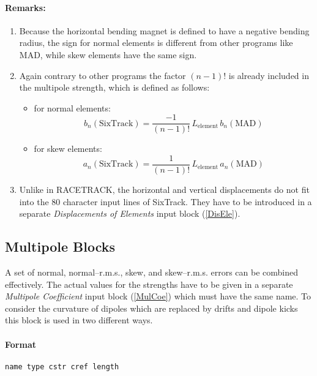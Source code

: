 \paragraph{Remarks:}
\begin{enumerate}
    \item Because the horizontal bending magnet is defined to have a negative bending radius, the sign for normal elements is different from other programs like MAD, while skew elements have the same sign.
    \item Again contrary to other programs the factor \mbox{$(n-1)$!} is already included in the multipole strength, which is defined as follows:
    \begin{itemize}
        \item for normal elements:
        \begin{equation*}
            b_{n}(\mathrm{SixTrack}) = \frac{-1}{(n-1)!}\,L_{\mathrm{element}}\,b_{n}(\mathrm{MAD})
        \end{equation*}
        \item for skew elements:
        \begin{equation*}
            a_{n}(\mathrm{SixTrack}) = \frac{1}{(n-1)!}\,L_{\mathrm{element}}\,a_{n}(\mathrm{MAD})
        \end{equation*}
    \end{itemize}
    \item Unlike in RACETRACK, the horizontal and vertical displacements do not fit into the 80 character input lines of SixTrack\@. They have to be introduced in a separate \textit{Displacements of Elements} input block (\ref{DisEle}).
\end{enumerate}

\subsection{Multipole Blocks} \label{MulBlo}

A set of normal, normal--r.m.s., skew, and skew--r.m.s. errors can be combined effectively.
The actual values for the strengths have to be given in a separate \textit{Multipole Coefficient} input block (\ref{MulCoe}) which must have the same name.
To consider the curvature of dipoles which are replaced by drifts and dipole kicks this block is used in two different ways.

\paragraph{Format} \texttt{name type cstr cref length}

